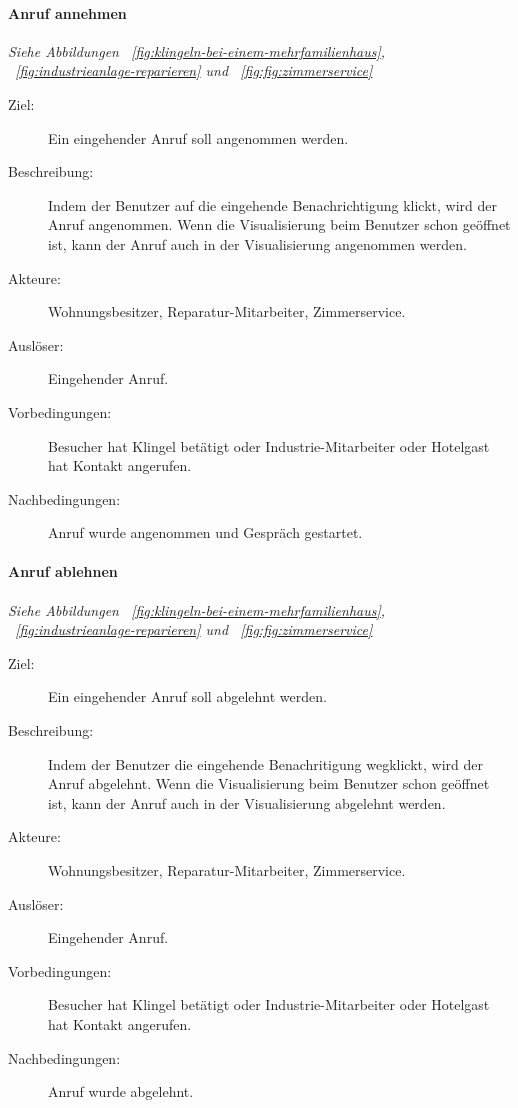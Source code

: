 \paragraph{\large{Anruf annehmen}}
\textit{Siehe Abbildungen ~\ref{fig:klingeln-bei-einem-mehrfamilienhaus}, ~\ref{fig:industrieanlage-reparieren} und ~\ref{fig:fig:zimmerservice}}
    \begin{description}
        \item[Ziel:] Ein eingehender Anruf soll angenommen werden.
        \item[Beschreibung:] Indem der Benutzer auf die eingehende Benachrichtigung klickt, wird der Anruf angenommen.
            Wenn die Visualisierung beim Benutzer schon geöffnet ist, kann der Anruf auch in der Visualisierung angenommen werden.
        \item[Akteure:] Wohnungsbesitzer, Reparatur-Mitarbeiter, Zimmerservice.
        \item[Auslöser:] Eingehender Anruf.
        \item[Vorbedingungen:] Besucher hat Klingel betätigt oder Industrie-Mitarbeiter oder Hotelgast hat Kontakt angerufen.
        \item[Nachbedingungen:] Anruf wurde angenommen und Gespräch gestartet.
    \end{description}

\paragraph{\large{Anruf ablehnen}}
\textit{Siehe Abbildungen ~\ref{fig:klingeln-bei-einem-mehrfamilienhaus}, ~\ref{fig:industrieanlage-reparieren} und ~\ref{fig:fig:zimmerservice}}
    \begin{description}
        \item[Ziel:] Ein eingehender Anruf soll abgelehnt werden.
        \item[Beschreibung:] Indem der Benutzer die eingehende Benachritigung wegklickt, wird der Anruf abgelehnt.
            Wenn die Visualisierung beim Benutzer schon geöffnet ist, kann der Anruf auch in der Visualisierung abgelehnt werden.
        \item[Akteure:] Wohnungsbesitzer, Reparatur-Mitarbeiter, Zimmerservice.
        \item[Auslöser:] Eingehender Anruf.
        \item[Vorbedingungen:] Besucher hat Klingel betätigt oder Industrie-Mitarbeiter oder Hotelgast hat Kontakt angerufen.
        \item[Nachbedingungen:] Anruf wurde abgelehnt.
    \end{description}

